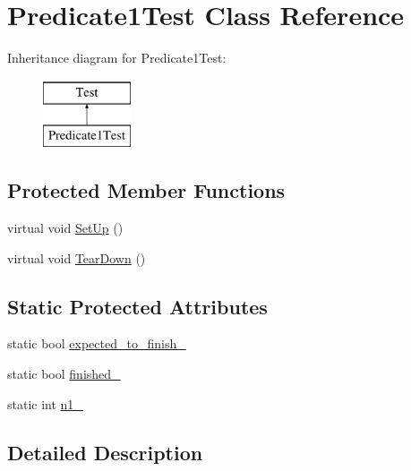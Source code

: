 \hypertarget{classPredicate1Test}{\section{\-Predicate1\-Test \-Class \-Reference}
\label{da/d9a/classPredicate1Test}
}
\-Inheritance diagram for \-Predicate1\-Test\-:\begin{figure}[H]
\begin{center}
\leavevmode
\includegraphics[height=2.000000cm]{da/d9a/classPredicate1Test}
\end{center}
\end{figure}
\subsection*{\-Protected \-Member \-Functions}
\begin{DoxyCompactItemize}
\item 
virtual void \hyperlink{classPredicate1Test_a901706a587f9ae84df8b2395fbe759cb}{\-Set\-Up} ()
\item 
virtual void \hyperlink{classPredicate1Test_a870a092058305911f3d42df45dd657e5}{\-Tear\-Down} ()
\end{DoxyCompactItemize}
\subsection*{\-Static \-Protected \-Attributes}
\begin{DoxyCompactItemize}
\item 
static bool \hyperlink{classPredicate1Test_af30fae6aaebdd5a6cb055c420573754d}{expected\-\_\-to\-\_\-finish\-\_\-}
\item 
static bool \hyperlink{classPredicate1Test_a9189d6cfedf2ace6f5f6aa152ba38f83}{finished\-\_\-}
\item 
static int \hyperlink{classPredicate1Test_a7a61c539c18d10f12696fc25b115d699}{n1\-\_\-}
\end{DoxyCompactItemize}


\subsection{\-Detailed \-Description}


